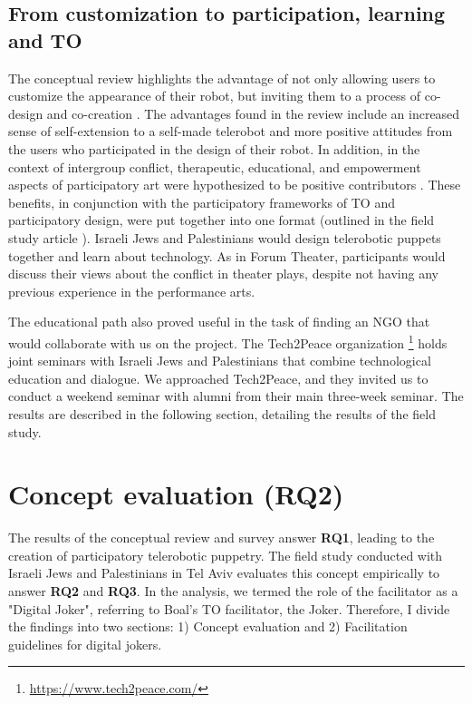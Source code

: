 \documentclass[dissertation,math,vertlayout,pdfa,colorlinks,nologo]{aaltoseries}
\begin{document}
\subsection{From customization to participation, learning and TO}
The conceptual review highlights the advantage of not only allowing users to customize the appearance of their robot, but inviting them to a process of co-design and co-creation \cite[p. 80]{peledTelerobotContactHypothesis2022}. The advantages found in the review include an increased sense of self-extension to a self-made telerobot and more positive attitudes from the users who participated in the design of their robot. In addition, in the context of intergroup conflict, therapeutic, educational, and empowerment aspects of participatory art were hypothesized to be positive contributors \cite[p. 80]{peledTelerobotContactHypothesis2022}. These benefits, in conjunction with the participatory frameworks of TO and participatory design, were put together into one format (outlined in the field study article \cite{peledTeleroboticTheaterOppressed2025}). Israeli Jews and Palestinians would design telerobotic puppets together and learn about technology. As in Forum Theater, participants would discuss their views about the conflict in theater plays, despite not having any previous experience in the performance arts.

The educational path also proved useful in the task of finding an NGO that would collaborate with us on the project. The Tech2Peace organization \footnote{\url{https://www.tech2peace.com/}} holds joint seminars with Israeli Jews and Palestinians that combine technological education and dialogue. We approached Tech2Peace, and they invited us to conduct a weekend seminar with alumni from their main three-week seminar. The results are described in the following section, detailing the results of the field study.

\section{Concept evaluation (RQ2)}
The results of the conceptual review and survey answer \textbf{RQ1}, leading to the creation of participatory telerobotic puppetry. The field study conducted with Israeli Jews and Palestinians in Tel Aviv evaluates this concept empirically to answer \textbf{RQ2} and \textbf{RQ3}. In the analysis, we termed the role of the facilitator as a "Digital Joker", referring to Boal's TO facilitator, the Joker. Therefore, I divide the findings into two sections: 1) Concept evaluation and 2) Facilitation guidelines for digital jokers.
\end{document}
